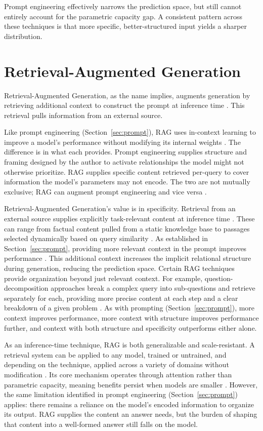 \documentclass[master]{thesis}
\newcommand{\sref}[1]{Section~\ref{#1}}  %
\begin{document}
Prompt engineering effectively narrows the prediction space, but still cannot entirely account for the parametric capacity gap. A consistent pattern across these techniques is that more specific, better-structured input yields a sharper distribution.


\section{Retrieval-Augmented Generation}
\label{sec:rag}


Retrieval-Augmented Generation, as the name implies, augments generation by retrieving additional context to construct the prompt at inference time \cite{lewis2020rag, rag_survey2023}. This retrieval pulls information from an external source.

Like prompt engineering (\sref{sec:prompt}), RAG uses in-context learning to improve a model's performance without modifying its internal weights \cite{lewis2020rag}. The difference is in what each provides. Prompt engineering supplies structure and framing designed by the author to activate relationships the model might not otherwise prioritize. RAG supplies specific content retrieved per-query to cover information the model's parameters may not encode. The two are not mutually exclusive; RAG can augment prompt engineering and vice versa \cite{prompt_eng_rag_slm2026}.

Retrieval-Augmented Generation's value is in specificity. Retrieval from an external source supplies explicitly task-relevant content at inference time \cite{lewis2020rag}. These can range from factual content pulled from a static knowledge base to passages selected dynamically based on query similarity \cite{rag_survey2023}. As established in \sref{sec:prompt}, providing more relevant context in the prompt improves performance \cite{brown2020gpt3}. This additional context increases the implicit relational structure during generation, reducing the prediction space. Certain RAG techniques provide organization beyond just relevant context. For example, question-decomposition approaches break a complex query into sub-questions and retrieve separately for each, providing more precise content at each step and a clear breakdown of a given problem \cite{question_decomp_rag2025}. As with prompting (\sref{sec:prompt}), more context improves performance, more context with structure improves performance further, and context with both structure and specificity outperforms either alone.

As an inference-time technique, RAG is both generalizable and scale-resistant. A retrieval system can be applied to any model, trained or untrained, and depending on the technique, applied across a variety of domains without modification \cite{rag_survey2023}. Its core mechanism operates through attention rather than parametric capacity, meaning benefits persist when models are smaller \cite{costofdownscaling2023}. However, the same limitation identified in prompt engineering (\sref{sec:prompt}) applies: there remains a reliance on the model's encoded information to organize its output. RAG supplies the content an answer needs, but the burden of shaping that content into a well-formed answer still falls on the model.
\end{document}
